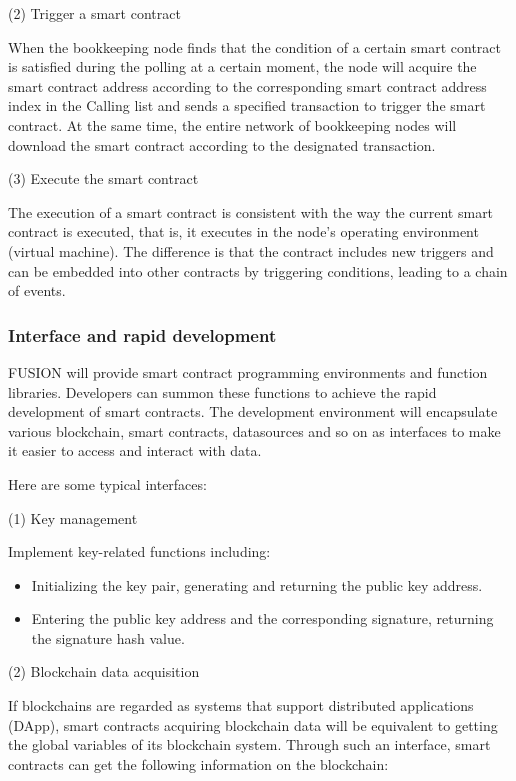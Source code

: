 \documentclass[a4paper,12pt]{article}
\begin{document}
(2) Trigger a smart contract

When the bookkeeping node finds that the condition of a certain smart contract is satisfied during the polling at a certain moment, the node will acquire the smart contract address according to the corresponding smart contract address index in the Calling list and sends a specified transaction to trigger the smart contract. At the same time, the entire network of bookkeeping nodes will download the smart contract according to the designated transaction.

(3) Execute the smart contract

The execution of a smart contract is consistent with the way the current smart contract is executed, that is, it executes in the node's operating environment (virtual machine). The difference is that the contract includes new triggers and can be embedded into other contracts by triggering conditions, leading to a chain of events.


\subsubsection{Interface and rapid development}

FUSION will provide smart contract programming environments and function libraries. Developers can summon these functions to achieve the rapid development of smart contracts. The development environment will encapsulate various blockchain, smart contracts, datasources and so on as interfaces to make it easier to access and interact with data.

Here are some typical interfaces:

(1) Key management

Implement key-related functions including:

\begin{itemize} [itemindent = 1em]
\item Initializing the key pair, generating and returning the public key address.
\item Entering the public key address and the corresponding signature, returning the signature hash value.
\end{itemize}

(2) Blockchain data acquisition

If blockchains are regarded as systems that support distributed applications (DApp), smart contracts acquiring blockchain data will be equivalent to getting the global variables of its blockchain system. Through such an interface, smart contracts can get the following information on the blockchain:
\end{document}
